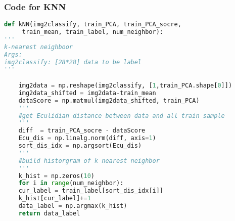 \documentclass[12pt]{article}
\begin{document}
	\pagebreak
	\subsubsection*{Code for KNN}
\begin{lstlisting}[language=Python]
def kNN(img2classify, train_PCA, train_PCA_socre,
	 train_mean, train_label, num_neighbor):
'''
k-nearest neighboor
Args:
img2classify: [28*28] data to be label
'''

	img2data = np.reshape(img2classify, [1,train_PCA.shape[0]])
	img2data_shifted = img2data-train_mean
	dataScore = np.matmul(img2data_shifted, train_PCA)
	'''
	#get Eculidian distance between data and all train sample
	'''
	diff  = train_PCA_socre - dataScore
	Ecu_dis = np.linalg.norm(diff, axis=1)
	sort_dis_idx = np.argsort(Ecu_dis)
	'''
	#build historgram of k nearest neighbor
	'''
	k_hist = np.zeros(10)
	for i in range(num_neighbor):
	cur_label = train_label[sort_dis_idx[i]]
	k_hist[cur_label]+=1
	data_label = np.argmax(k_hist)
	return data_label
\end{lstlisting}
\vspace{2em}
\end{document}
